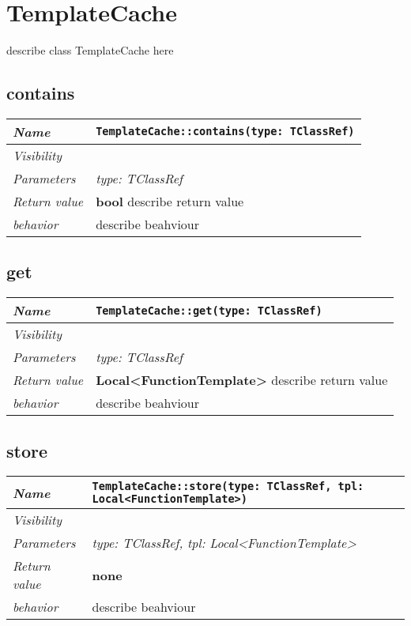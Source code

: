  \chapter{TemplateCache}
describe class TemplateCache here
\section{contains}
\begin{longtable}{p{3cm} @{\hskip 1cm} p{12cm}}
 \hline
\textit{Name} & \texttt{TemplateCache::contains(type: TClassRef)}\\
\hline
 \textit{Visibility} & \\
\hline
\textit{Parameters} & \textit{type: TClassRef}\\
\hline
\textit{Return value} & \textbf{ bool} describe return value\\
  \hline
 \textit{behavior} & describe beahviour \\
\hline
\end{longtable} \pagebreak
 \section{get}
\begin{longtable}{p{3cm} @{\hskip 1cm} p{12cm}}
 \hline
\textit{Name} & \texttt{TemplateCache::get(type: TClassRef)}\\
\hline
 \textit{Visibility} & \\
\hline
\textit{Parameters} & \textit{type: TClassRef}\\
\hline
\textit{Return value} & \textbf{ Local<FunctionTemplate>} describe return value\\
  \hline
 \textit{behavior} & describe beahviour \\
\hline
\end{longtable} \pagebreak
 \section{store}
\begin{longtable}{p{3cm} @{\hskip 1cm} p{12cm}}
 \hline
\textit{Name} & \texttt{TemplateCache::store(type: TClassRef, tpl: Local<FunctionTemplate>)}\\
\hline
 \textit{Visibility} & \\
\hline
\textit{Parameters} & \textit{type: TClassRef, tpl: Local<FunctionTemplate>}\\
\hline
\textit{Return value} & \textbf{none}\\
  \hline
 \textit{behavior} & describe beahviour \\
\hline
\end{longtable} \pagebreak
